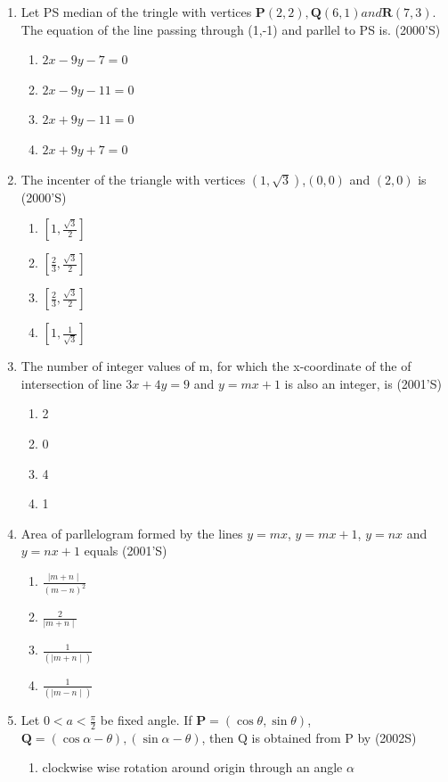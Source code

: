 \documentclass[12pt]{article}
\let\vec\mathbf
\begin{document}
\begin{enumerate}
\begin{enumerate}
\end{enumerate}
\item Let PS median of the tringle with vertices $\vec{P}(2,2), \vec{Q}(6,1) and \vec{R}(7,3)$. The equation of the line passing through (1,-1) and parllel to PS is. (2000'S)
\begin{enumerate}
\item $2x-9y-7=0$ 
\item $2x-9y-11=0$ 
\item $2x+9y-11=0$
\item $2x+9y+7=0$
\end{enumerate}
\item The incenter of the triangle with vertices $(1,\sqrt{3})$,$(0,0)$ and $(2,0)$ is (2000'S)
\begin{enumerate}
\item $[1,\frac{\sqrt{3}}{2}]$ 
\item $[\frac{2}{3},\frac{\sqrt{3}}{2}]$ 
\item $[\frac{2}{3},\frac{\sqrt{3}}{2}]$ 
\item $[1,\frac{1}{{\sqrt{3}}}]$
\end{enumerate}
\item The number of integer values of m, for which the x-coordinate of the of intersection of line $3x+4y=9$ and $y=mx+1$ is also an integer, is (2001'S)
\begin{enumerate}
\item 2 
\item 0 
\item 4   
\item 1
\end{enumerate}
\item Area of parllelogram formed by the lines $y=mx$, $y=mx+1$, $y=nx$ and $y=nx+1$ equals (2001'S)
\begin{enumerate}
\item $\frac{\mid m+n\mid}{(m-n)^2}$
\item $\frac{2}{\mid m+n \mid}$
\item $\frac{1}{(\mid m+n \mid)}$
\item $\frac{1}{(\mid m-n\mid)}$
\end{enumerate}
\item Let $0<a<\frac{\pi}{2}$ be fixed angle. If $\vec{P}=(\cos\theta,\sin\theta)$, $\vec{Q}=(\cos\alpha-\theta),(\sin\alpha-\theta)$, then Q is obtained from P by (2002S)
\begin{enumerate}
\item clockwise wise rotation around origin through an angle $\alpha$

\end{enumerate}
\end{enumerate}
\end{document}
